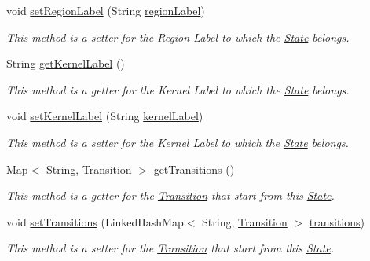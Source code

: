 \begin{DoxyCompactItemize}
void \hyperlink{classese_1_1seas_1_1upenn_1_1edu_1_1_state_aeaa23bcd638d8771032963a71e1100ee}{set\+Region\+Label} (String \hyperlink{classese_1_1seas_1_1upenn_1_1edu_1_1_state_aca85473fdbd47fcee944387b2f11b5ac}{region\+Label})
\begin{DoxyCompactList}\small\item\em This method is a setter for the Region Label to which the \hyperlink{classese_1_1seas_1_1upenn_1_1edu_1_1_state}{State} belongs. \end{DoxyCompactList}\item 
String \hyperlink{classese_1_1seas_1_1upenn_1_1edu_1_1_state_a91db5f49031a058a349fbec466a4af29}{get\+Kernel\+Label} ()
\begin{DoxyCompactList}\small\item\em This method is a getter for the Kernel Label to which the \hyperlink{classese_1_1seas_1_1upenn_1_1edu_1_1_state}{State} belongs. \end{DoxyCompactList}\item 
void \hyperlink{classese_1_1seas_1_1upenn_1_1edu_1_1_state_a7e3024a79defcd36529d048f3862a9c7}{set\+Kernel\+Label} (String \hyperlink{classese_1_1seas_1_1upenn_1_1edu_1_1_state_a1988575cfbba31954fdf6e531da5755b}{kernel\+Label})
\begin{DoxyCompactList}\small\item\em This method is a setter for the Kernel Label to which the \hyperlink{classese_1_1seas_1_1upenn_1_1edu_1_1_state}{State} belongs. \end{DoxyCompactList}\item 
Map$<$ String, \hyperlink{classese_1_1seas_1_1upenn_1_1edu_1_1_transition}{Transition} $>$ \hyperlink{classese_1_1seas_1_1upenn_1_1edu_1_1_state_ada81ad54ed6e47f678fc64542453ad8d}{get\+Transitions} ()
\begin{DoxyCompactList}\small\item\em This method is a getter for the \hyperlink{classese_1_1seas_1_1upenn_1_1edu_1_1_transition}{Transition} that start from this \hyperlink{classese_1_1seas_1_1upenn_1_1edu_1_1_state}{State}. \end{DoxyCompactList}\item 
void \hyperlink{classese_1_1seas_1_1upenn_1_1edu_1_1_state_a408bdbf6b39b1bba4be3e546a0673d98}{set\+Transitions} (Linked\+Hash\+Map$<$ String, \hyperlink{classese_1_1seas_1_1upenn_1_1edu_1_1_transition}{Transition} $>$ \hyperlink{classese_1_1seas_1_1upenn_1_1edu_1_1_state_aeac8f20207dd613d1b9f3524315d7ff3}{transitions})
\begin{DoxyCompactList}\small\item\em This method is a setter for the \hyperlink{classese_1_1seas_1_1upenn_1_1edu_1_1_transition}{Transition} that start from this \hyperlink{classese_1_1seas_1_1upenn_1_1edu_1_1_state}{State}. \end{DoxyCompactList}\item 

\end{DoxyCompactItemize}

